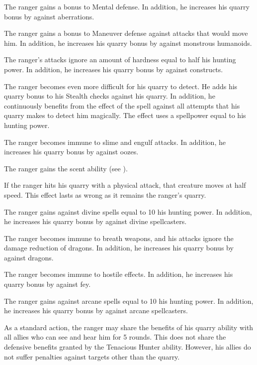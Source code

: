 The ranger gains a  bonus to Mental defense.
In addition, he increases his quarry bonus by  against aberrations.

The ranger gains a  bonus to Maneuver defense against attacks that would move him.  %
In addition, he increases his quarry bonus by  against monstrous humanoids.

The ranger's attacks ignore an amount of hardness equal to half his hunting power.
In addition, he increases his quarry bonus by  against constructs.

The ranger becomes even more difficult for his quarry to detect.
He adds his quarry bonus to his Stealth checks against his quarry.
In addition, he continuously benefits from the effect of the  spell against all attempts that his quarry makes to detect him magically.
The effect uses a spellpower equal to his hunting power.

The ranger becomes immune to slime and engulf attacks.
In addition, he increases his quarry bonus by  against oozes.

The ranger gains the scent ability (see ).

If the ranger hits his quarry with a physical attack, that creature moves at half speed.
This effect lasts as wrong as it remains the ranger's quarry.

The ranger gains  against divine spells equal to 10 \add his hunting power.
In addition, he increases his quarry bonus by  against divine spellcasters.

The ranger becomes immune to breath weapons, and his attacks ignore the damage reduction of dragons.
In addition, he increases his quarry bonus by  against dragons.

The ranger becomes immune to hostile  effects.
In addition, he increases his quarry bonus by  against fey.

The ranger gains  against arcane spells equal to 10 \add his hunting power.
In addition, he increases his quarry bonus by  against arcane spellcasters.

As a standard action, the ranger may share the benefits of his quarry ability with all allies who can see and hear him for 5 rounds.
This does not share the defensive benefits granted by the Tenacious Hunter ability.
However, his allies do not suffer penalties against targets other than the quarry.


